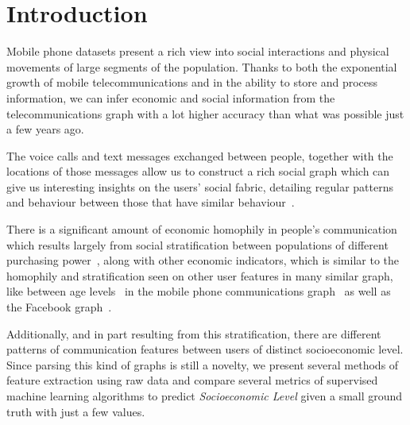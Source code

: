 \section{Introduction}

Mobile phone datasets present a rich view into social interactions and physical movements of large segments of the population. Thanks to both the exponential growth of mobile telecommunications and in the ability to store and process information, we can infer economic and social information from the telecommunications graph with a lot higher accuracy than what was possible just a few years ago.

The voice calls and text messages exchanged between people, together with the locations of those messages allow us to construct a rich social graph which can give us interesting insights on the users' social fabric, detailing regular patterns and behaviour between those that have similar behaviour~\cite{gonzalez2008understanding, ponieman2013human, sarraute2015city}.

There is a significant amount of economic homophily in people's communication~\cite{fixmanasonam2016} which results largely from social stratification between populations of different purchasing power~\cite{leo2015socioeconomic}, along with other economic indicators, which is similar to the homophily and stratification seen on other user features in many similar graph, like between age levels~\cite{mcpherson2001birds} in the mobile phone communications graph~\cite{sarraute2014} as well as the Facebook graph~\cite{ugander2011anatomy}.

Additionally, and in part resulting from this stratification, there are different patterns of communication features between users of distinct socioeconomic level. Since parsing this kind of graphs is still a novelty, we present several methods of feature extraction using raw data and compare several metrics of supervised machine learning algorithms to predict \emph{Socioeconomic Level} given a small ground truth with just a few values.
